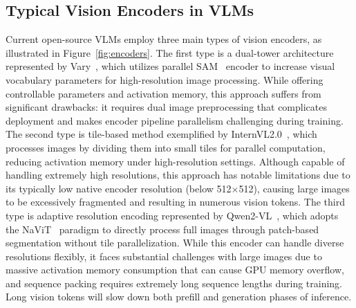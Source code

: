\documentclass[11pt, a4paper, logo, copyright, nonumbering]{deepseek}
\begin{document}
\begin{CJK*}{UTF8}{gbsn}

\subsection{Typical Vision Encoders in VLMs}

\label{sec:related1}

Current open-source VLMs employ three main types of vision encoders, as illustrated in Figure~\ref{fig:encoders}. The first type is a dual-tower architecture represented by Vary~\cite{wei2024vary}, which utilizes parallel SAM~\cite{kirillov2023segment} encoder to increase visual vocabulary parameters for high-resolution image processing. While offering controllable parameters and activation memory, this approach suffers from significant drawbacks: it requires dual image preprocessing that complicates deployment and makes encoder pipeline parallelism challenging during training. The second type is tile-based method exemplified by InternVL2.0~\cite{chen2024internvl2}, which processes images by dividing them into small tiles for parallel computation, reducing activation memory under high-resolution settings. Although capable of handling extremely high resolutions, this approach has notable limitations due to its typically low native encoder resolution (below 512$\times$512), causing large images to be excessively fragmented and resulting in numerous vision tokens. The third type is adaptive resolution encoding represented by Qwen2-VL~\cite{wang2024qwen2}, which adopts the NaViT~\cite{dehghani2023patch} paradigm to directly process full images through patch-based segmentation without tile parallelization. While this encoder can handle diverse resolutions flexibly, it faces substantial challenges with large images due to massive activation memory consumption that can cause GPU memory overflow, and sequence packing requires extremely long sequence lengths during training. Long vision tokens will slow down both prefill and generation phases of inference.



\end{CJK*}
\end{document}
